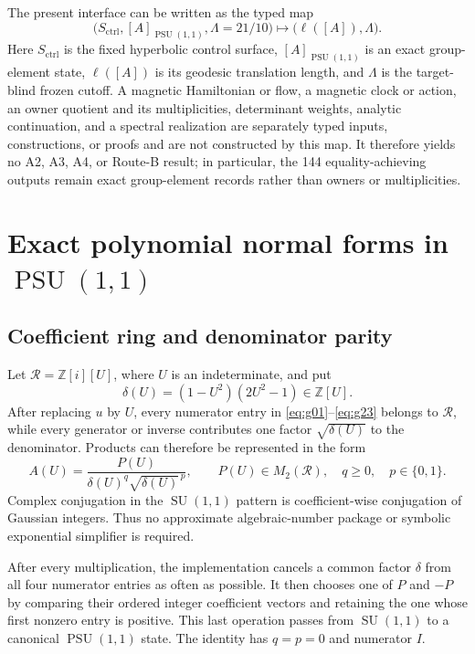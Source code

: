 \documentclass[11pt,a4paper]{article}
\theoremstyle{definition}
\newcommand{\Z}{\mathbb Z}
\newcommand{\PSU}{\operatorname{PSU}}
\newcommand{\SU}{\operatorname{SU}}
\newcommand{\length}{\ell}
\begin{document}
The present interface can be written as the typed map
\[
 \bigl(S_{\mathrm{ctrl}},[A]_{\PSU(1,1)},\Lambda=21/10\bigr)
 \longmapsto
 \bigl(\length([A]),\Lambda\bigr).
\]
Here \(S_{\mathrm{ctrl}}\) is the fixed hyperbolic control surface,
\([A]_{\PSU(1,1)}\) is an exact group-element state, \(\length([A])\) is its
geodesic translation length, and \(\Lambda\) is the target-blind frozen
cutoff.  A magnetic Hamiltonian or flow, a magnetic clock or action, an owner
quotient and its multiplicities, determinant weights, analytic continuation,
and a spectral realization are separately typed inputs, constructions, or
proofs and are not constructed by this map.  It therefore yields no A2, A3,
A4, or Route-B result; in particular, the 144 equality-achieving outputs
remain exact group-element records rather than owners or multiplicities.

\section{Exact polynomial normal forms in \texorpdfstring{\(\PSU(1,1)\)}{PSU(1,1)}}
\label{sec:normal-form}

\subsection{Coefficient ring and denominator parity}

Let \(\mathcal R=\Z[i][U]\), where \(U\) is an indeterminate, and put
\[
 \delta(U)=(1-U^2)(2U^2-1)\in\Z[U].
\]
After replacing \(u\) by \(U\), every numerator entry in
\eqref{eq:g01}--\eqref{eq:g23} belongs to \(\mathcal R\), while every generator
or inverse contributes one factor \(\sqrt{\delta(U)}\) to the denominator.
Products can therefore be represented in the form
\begin{equation}\label{eq:state-form}
 A(U)=\frac{P(U)}{\delta(U)^q\sqrt{\delta(U)}^{\,p}},
 \qquad P(U)\in M_2(\mathcal R),\quad q\geq0,\quad p\in\{0,1\}.
\end{equation}
Complex conjugation in the \(\SU(1,1)\) pattern is coefficient-wise
conjugation of Gaussian integers.  Thus no approximate algebraic-number
package or symbolic exponential simplifier is required.

After every multiplication, the implementation cancels a common factor
\(\delta\) from all four numerator entries as often as possible.  It then
chooses one of \(P\) and \(-P\) by comparing their ordered integer coefficient
vectors and retaining the one whose first nonzero entry is positive.  This
last operation passes from \(\SU(1,1)\) to a canonical \(\PSU(1,1)\) state.
The identity has \(q=p=0\) and numerator \(I\).
\end{document}
